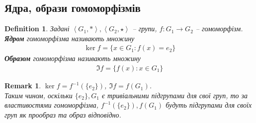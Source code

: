 \documentclass[a4paper, 10pt]{article}
\theoremstyle{theoremdd}
\theoremstyle{theoremdd}
\newtheorem{definition}[theorem]{Definition}
\theoremstyle{theoremdd}
\theoremstyle{theoremdd}
\theoremstyle{theoremdd}
\theoremstyle{theoremdd}
\theoremstyle{theoremdd}
\theoremstyle{theoremdd}
\theoremstyle{theoremdd}
\theoremstyle{theoremdd}
\theoremstyle{theoremdd}
\newtheorem{remark}[theorem]{Remark}
\theoremstyle{theoremdd}
\theoremstyle{theoremdd}
\theoremstyle{theoremdd}
\theoremstyle{theoremdd}
\newcommand\homom[2]{\text{Hom}({#1},{#2})}
\newcommand\End[1]{\text{End}({#1})}
\newcommand\Aut[1]{\text{Aut}({#1})}
\begin{document}
\iffalse
\subsection{Ендоморфізми та автоморфізми}
\begin{definition}
Задано $\left< G, * \right>$ -- група.\\
Гомоморфізм $f$ є \textbf{ендоморфізмом}, якщо в нас таке відображення:
\begin{align*}
f \colon G \to G,
\end{align*}
тобто із групи в $G$ на ту саму групу $G$.\\
Позначення: $\End{G}$ -- множина всіх ендоморфізмів.
\end{definition}

\begin{definition}
Задано $\left< G, * \right>$ -- група.\\
Відображення $f$ називається \textbf{автоморфізмом}, якщо
\begin{align*}
f \colon G \to G \text{ -- ізоморфізм}
\end{align*}
Позначення: $\Aut{G}$ -- множина всіх автоморфізмів.
\end{definition}

\begin{remark}
$\End{G} = \homom{G}{G}$ \qquad $\Aut{G} \subset \End{G}$.
\end{remark}
\fi

\subsection{Ядра, образи гомоморфізмів}
\begin{definition}
Задані $\left<G_1, * \right>,\left<G_2, \star \right>$ -- групи, $f \colon G_1 \to G_2$ -- гомоморфізм.\\
\textbf{Ядром} гомоморфізма називають множину
\begin{align*}
\ker f = \{ x \in G_1: f(x) = e_2 \}
\end{align*}
\textbf{Образом} гомоморфізма називають множину
\begin{align*}
\Im f = \{f(x) : x \in G_1\}
\end{align*}
\end{definition}

\begin{remark}
$\ker f = f^{-1}(\{e_2\})$, \qquad $\Im f = f(G_1)$.\\
Таким чином, оскільки $\{e_2\}, G_1$ є тривіальними підгрупами для свої груп, то за властивостями гомоморфізма, $f^{-1}(\{e_2\}), f(G_1)$ будуть підгрупами для своїх груп як прообраз та образ відповідно.
\end{remark}
\end{document}
